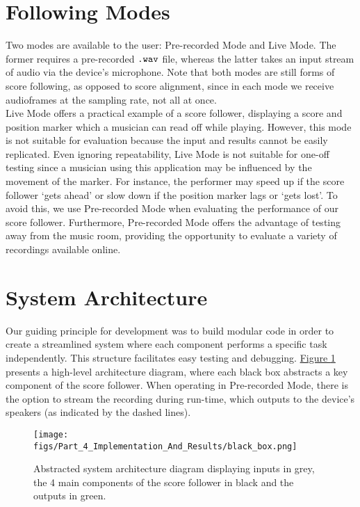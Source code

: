 \section{Following Modes}
Two modes are available to the user: Pre-recorded Mode and Live Mode. The former requires a pre-recorded $\verb|.wav|$ file, whereas the latter takes an input stream of audio via the device's microphone. Note that both modes are still forms of score following, as opposed to score alignment, since in each mode we receive audioframes at the sampling rate, not all at once.\\

Live Mode offers a practical example of a score follower, displaying a score and position marker which a musician can read off while playing. However, this mode is not suitable for evaluation because the input and results cannot be easily replicated. Even ignoring repeatability, Live Mode is not suitable for one-off testing since a musician using this application may be influenced by the movement of the marker. For instance, the performer may speed up if the score follower `gets ahead' or slow down if the position marker lags or `gets lost'. To avoid this, we use Pre-recorded Mode when evaluating the performance of our score follower. Furthermore, Pre-recorded Mode offers the advantage of testing away from the music room, providing the opportunity to evaluate a variety of recordings available online. 

\section{System Architecture}
Our guiding principle for development was to build modular code in order to create a streamlined system where each component performs a specific task independently. This structure facilitates easy testing and debugging. \hyperref[fig:black_box]{Figure \ref*{fig:black_box}} presents a high-level architecture diagram, where each black box abstracts a key component of the score follower. When operating in Pre-recorded Mode, there is the option to stream the recording during run-time, which outputs to the device's speakers (as indicated by the dashed lines).

\begin{figure}[H]
    \centering
    \texttt{[image: figs/Part\_4\_Implementation\_And\_Results/black\_box.png]}
    \caption{Abstracted system architecture diagram displaying inputs in grey, the 4 main components of the score follower in black and the outputs in green.}
    \label{fig:black_box}
\end{figure}

